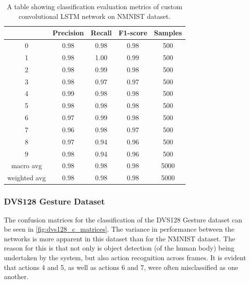 \begin{table}[htb]
    \centering
    \begin{tabular}{|| c | c | c | c | c ||}
        \hline
             & Precision & Recall & F1-score & Samples \\
        \hline \hline
        0            & 0.98 & 0.98 & 0.98 & 500  \\
        \hline
        1            & 0.98 & 1.00 & 0.99 & 500  \\
        \hline
        2            & 0.98 & 0.99 & 0.98 & 500  \\
        \hline
        3            & 0.98 & 0.97 & 0.97 & 500  \\
        \hline
        4            & 0.99 & 0.98 & 0.98 & 500  \\
        \hline
        5            & 0.98 & 0.98 & 0.98 & 500  \\
        \hline
        6            & 0.97 & 0.99 & 0.98 & 500  \\
        \hline
        7            & 0.96 & 0.98 & 0.97 & 500  \\
        \hline
        8            & 0.97 & 0.94 & 0.96 & 500  \\
        \hline
        9            & 0.98 & 0.94 & 0.96 & 500  \\
        \hline
        macro avg    & 0.98 & 0.98 & 0.98 & 5000 \\
        \hline
        weighted avg & 0.98 & 0.98 & 0.98 & 5000 \\
        \hline
    \end{tabular}
    \caption{A table showing classification evaluation metrics of custom convolutional LSTM network on NMNIST dataset.}
    \label{tab:custom_conv_lstm_nmnist_evaluation_metrics}
\end{table}

\subsubsection{DVS128 Gesture Dataset}

The confusion matrices for the classification of the DVS128 Gesture dataset can be seen in \cref{fig:dvs128_c_matrices}. The variance in performance between the networks is more apparent in this dataset than for the NMNIST dataset. The reason for this is that not only is object detection (of the human body) being undertaken by the system, but also action recognition across frames. It is evident that actions 4 and 5, as well as actions 6 and 7, were often misclassified as one another.

